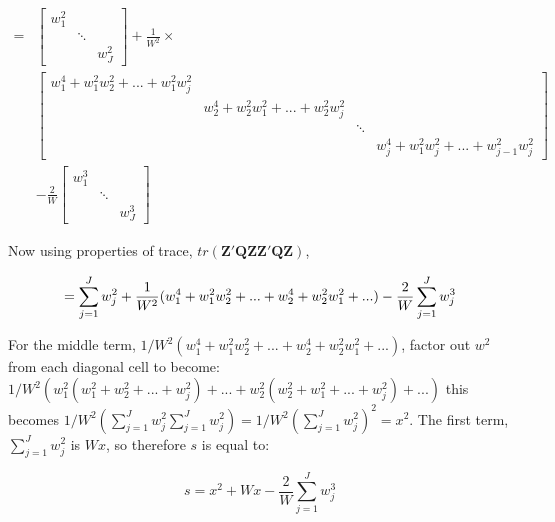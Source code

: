 \begin{equation}
\begin{split}
     = & \begin{bmatrix}
        w_1^2 & &   \\
         &  \ddots &  \\
         & &   w_J^2
    \end{bmatrix}   + \frac{1}{W^2}   \times \\
     & \begin{bmatrix}
         w^4_1 +w^2_1w^2_2 + ...+w^2_1w^2_j & & \\
         & w^4_2 +w^2_2w^2_1 + ...+w^2_2w^2_j & \\
          & &  \ddots &  \\
         & &  &w^4_j +w^2_1w^2_j + ...+w^2_{j-1}w^2_j 
     \end{bmatrix} \\ &- 
    \frac{2}{W} \begin{bmatrix}
        w_1^3 & &   \\
         &  \ddots &  \\
         & &   w_J^3
    \end{bmatrix} 
\end{split}
    \nonumber
\end{equation}


Now using properties of trace, $tr( \mathbf{Z}'\mathbf{Q}\mathbf{Z}\mathbf{Z}'\mathbf{Q}\mathbf{Z})$,

\begin{equation}
    =\sum_{j=1}^J w_j^2 + \frac{1}{W^2} (w^4_1+w^2_1w^2_2+...+w^4_2+w^2_2w^2_1 +...) - \frac{2}{W} \sum_{j=1}^Jw_j^3
    \nonumber
    \\
\end{equation}


For the middle term, $1/W^2(w^4_1+w^2_1w^2_2+...+w^4_2+w^2_2w^2_1 +...)$, factor out $w^2$ from each diagonal cell to become: $1/W^2(w^2_1(w^2_1+w^2_2+ ... + w_j^2)+...+w_2^2(w^2_2+w^2_1+ ...+ w_j^2 )+...)$ this becomes $1/W^2(\sum_{j=1}^Jw_j^2\sum_{j=1}^Jw_j^2) = 1/W^2(\sum_{j=1}^Jw_j^2)^2 = x^2$. The first term, $\sum_{j=1}^J w_j^2 $ is $Wx$, so therefore $s$ is equal to:

\begin{equation}
    s = x^2 + Wx - \frac{2}{W} \sum_{j=1}^Jw_j^3
    \nonumber
\end{equation}


